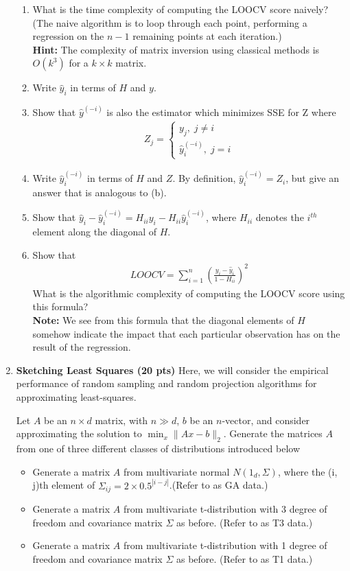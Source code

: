 \begin{enumerate}
\begin{enumerate}
    \item What is the time complexity of computing the LOOCV score naively? (The naive algorithm is to loop through each point, performing a regression on the $n-1$ remaining points at each iteration.)\\
    \textbf{Hint:} The complexity of matrix inversion using classical methods is $O(k^3)$ for a $k \times k$ matrix.
    \item Write $\hat{y}_i$ in terms of $H$ and $y$.
    \item Show that $\hat{y}^{(-i)}$ is also the estimator which minimizes SSE for Z where
    \begin{align*}
        Z_j=\begin{cases}y_j,\; j\neq i\\ \hat{y}_i^{(-i)}, \; j=i \end{cases}
    \end{align*}
    \item Write $\hat{y}_i^{(-i)}$ in terms of $H$ and $Z$. By definition, $\hat{y}_i^{(-i)}=Z_i$, but give an answer that is analogous to (b).
    \item Show that $\hat{y}_i-\hat{y}_i^{(-i)}=H_{ii}y_i-H_{ii}\hat{y}_i^{(-i)}$, where $H_{ii} $ denotes the $i^{th}$ element along the diagonal of $H$.
    \item Show that
    \begin{align*}
        LOOCV= \sum_{i=1}^n \left( \frac{y_i-\hat{y}_i}{1-H_{ii}}\right)^2
    \end{align*}
    What is the algorithmic complexity of computing the LOOCV score using this formula?\\
   \textbf{ Note:} We see from this formula that the diagonal elements of $H$ somehow indicate the impact that each particular observation has on the result of the regression.
\end{enumerate}
\solution{
}

\item \textbf{Sketching Least Squares  (20 pts)}
Here, we will consider the empirical performance of random sampling and random projection algorithms for approximating least-squares. 

Let $A$ be an $n \times d$ matrix, with $n \gg d$, $b$ be an $n$-vector, and consider approximating the solution to $\min_x \|Ax-b\|_2$. Generate the matrices $A$ from one of three different classes of distributions introduced below
    \begin{itemize}
        \item Generate a matrix $A$ from multivariate normal $N(1_d, \Sigma)$, where the (i, j)th element of $\Sigma_{ij} = 2\times 0.5^{|i-j|}$.(Refer to as GA data.)
        \item Generate a matrix $A$ from multivariate t-distribution with 3 degree of freedom and covariance matrix $\Sigma$ as before. (Refer to as T3 data.)
        \item  Generate a matrix $A$ from multivariate t-distribution with 1 degree of freedom and covariance matrix $\Sigma$ as before. (Refer to as T1 data.)
    \end{itemize}
    

\end{enumerate}
